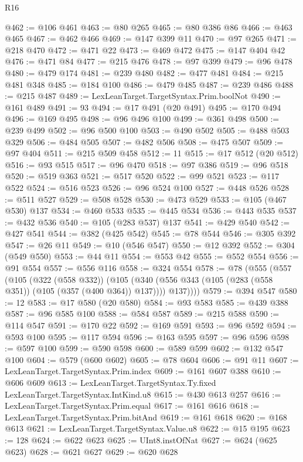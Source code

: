 \begin{lexlean}{R16}
\begin{coremodule}
@462 := @106 @461
@463 := @80 @265
@465 := @80 @386 @86
@466 := @463 @465
@467 := @462 @466
@469 := @147 @399 @11
@470 := @97 @265
@471 := @218 @470
@472 := @471 @22
@473 := @469 @472
@475 := @147 @404 @42
@476 := @471 @84
@477 := @215 @476
@478 := @97 @399
@479 := @96 @478
@480 := @479 @174
@481 := @239 @480
@482 := @477 @481
@484 := @215 @481 @348
@485 := @184 @100
@486 := @479 @485
@487 := @239 @486
@488 := @215 @487
@489 := LexLeanTarget.TargetSyntax.Prim.boolNot
@490 := @161 @489
@491 := 93
@494 := @17 @491 (@20 @491)
@495 := @170 @494
@496 := @169 @495
@498 := @96 @496 @100
@499 := @361 @498
@500 := @239 @499
@502 := @96 @500 @100
@503 := @490 @502
@505 := @488 @503 @329
@506 := @484 @505
@507 := @482 @506
@508 := @475 @507
@509 := @97 @404
@511 := @215 @509 @458
@512 := 11
@515 := @17 @512 (@20 @512)
@516 := @93 @515
@517 := @96 @470
@518 := @97 @386
@519 := @96 @518
@520 := @519 @363
@521 := @517 @520
@522 := @99 @521
@523 := @117 @522
@524 := @516 @523
@526 := @96 @524 @100
@527 := @448 @526
@528 := @511 @527
@529 := @508 @528
@530 := @473 @529
@533 := @105 (@467 @530) @137
@534 := @460 @533
@535 := @445 @534
@536 := @443 @535
@537 := @432 @536
@540 := @105 (@283 @537) @137
@541 := @429 @540
@542 := @427 @541
@544 := @382 (@425 @542)
@545 := @78 @544
@546 := @305 @392
@547 := @26 @11
@549 := @10 (@546 @547)
@550 := @12 @392
@552 := @304 (@549 @550)
@553 := @44 @11
@554 := @553 @42
@555 := @552 @554
@556 := @91 @554
@557 := @556 @116
@558 := @324 @554
@578 := @78
    (@555
      (@557
        (@105
          (@322 (@558 @332))
          (@105 (@340 (@556 @343 (@105 (@283 (@558 @351)) (@105 (@357 (@400 @364)) @137)))) @137))))
@579 := @394 @547
@580 := 12
@583 := @17 @580 (@20 @580)
@584 := @93 @583
@585 := @439 @388
@587 := @96 @585 @100
@588 := @584 @587
@589 := @215 @588
@590 := @114 @547
@591 := @170 @22
@592 := @169 @591
@593 := @96 @592
@594 := @593 @100
@595 := @117 @594
@596 := @163 @595
@597 := @96 @596
@598 := @597 @100
@599 := @590 @598
@600 := @589 @599
@602 := @132 @547 @100
@604 := @579 (@600 @602)
@605 := @78 @604
@606 := @91 @11
@607 := LexLeanTarget.TargetSyntax.Prim.index
@609 := @161 @607 @388
@610 := @606 @609
@613 := LexLeanTarget.TargetSyntax.Ty.fixed LexLeanTarget.TargetSyntax.IntKind.u8
@615 := @430 @613 @257
@616 := LexLeanTarget.TargetSyntax.Prim.equal
@617 := @161 @616
@618 := LexLeanTarget.TargetSyntax.Prim.bitAnd
@619 := @161 @618
@620 := @168 @613
@621 := LexLeanTarget.TargetSyntax.Value.u8
@622 := @15 @195
@623 := 128
@624 := @622 @623
@625 := UInt8.instOfNat
@627 := @624 (@625 @623)
@628 := @621 @627
@629 := @620 @628

\end{coremodule}
\end{lexlean}
